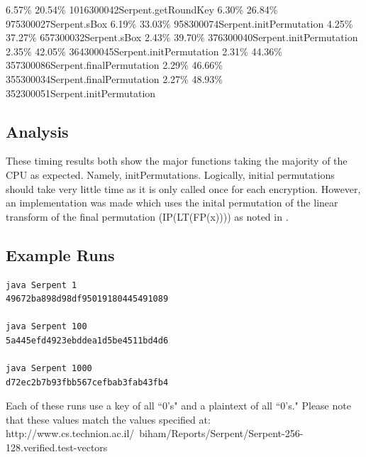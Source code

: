 \documentclass[12pt]{article} %
\newcommand{\tab}{\hspace*{2em}}
\begin{document}
\tab  6.57\tab\% 20.54\tab\%    1016\tab 300042\tab Serpent.getRoundKey
\tab  6.30\tab\% 26.84\tab\%     975\tab 300027\tab Serpent.sBox
\tab  6.19\tab\% 33.03\tab\%     958\tab 300074\tab Serpent.initPermutation
\tab  4.25\tab\% 37.27\tab\%     657\tab 300032\tab Serpent.sBox
\tab  2.43\tab\% 39.70\tab\%     376\tab 300040\tab Serpent.initPermutation
\tab  2.35\tab\% 42.05\tab\%     364\tab 300045\tab Serpent.initPermutation
\tab  2.31\tab\% 44.36\tab\%     357\tab 300086\tab Serpent.finalPermutation
\tab  2.29\tab\% 46.66\tab\%     355\tab 300034\tab Serpent.finalPermutation
\tab  2.27\tab\% 48.93\tab\%     352\tab 300051\tab Serpent.initPermutation
\subsection{Analysis}
These timing results both show the major functions taking the majority of the CPU as expected. Namely, initPermutations. Logically, initial permutations should take very little time as it is only called once for each encryption. However, an implementation was made which uses the inital permutation of the linear transform of the final permutation (IP(LT(FP(x)))) as noted in \cite{SERPENT}.

\subsection{Example Runs}
\begin{lstlisting}
java Serpent 1
49672ba898d98df95019180445491089

java Serpent 100
5a445efd4923ebddea1d5be4511bd4d6

java Serpent 1000
d72ec2b7b93fbb567cefbab3fab43fb4

\end{lstlisting}
Each of these runs use a key of all ``0's" and a plaintext of all ``0's." Please note that these values match the values specified at: http://www.cs.technion.ac.il/~biham/Reports/Serpent/Serpent-256-128.verified.test-vectors
\end{document}
